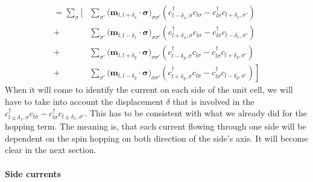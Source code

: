 \documentclass[../main.tex]{subfile}
\begin{document}
\begin{equation}\label{eq:CurrentAltermagCommu}
    \begin{aligned}
        = \sum_{\sigma}\Biggl[&
                \sum_{\sigma'}\bigl(\bm{m}_{l,l+\delta_x}\cdot\bm{\sigma}\bigr)_{\sigma\sigma'}
                \left(c_{l-\delta_x,\sigma}^{\dagger}c_{l\sigma} - c_{l\sigma}^{\dagger}c_{l+\delta_x,\sigma'} \right) \\
                +&\sum_{\sigma'}\bigl(\bm{m}_{l,l-\delta_x}\cdot\bm{\sigma}\bigr)_{\sigma\sigma'}
                \left(c_{l+\delta_x,\sigma}^{\dagger}c_{l\sigma} - c_{l\sigma}^{\dagger}c_{l-\delta_x,\sigma'} \right) \\
                +&\sum_{\sigma'}\bigl(\bm{m}_{l,l+\delta_y}\cdot\bm{\sigma}\bigr)_{\sigma\sigma'}
                \left(c_{l-\delta_y,\sigma}^{\dagger}c_{l\sigma} - c_{l\sigma}^{\dagger}c_{l+\delta_y,\sigma'} \right) \\
                +& \sum_{\sigma'}\bigl(\bm{m}_{l,l-\delta_y}\cdot\bm{\sigma}\bigr)_{\sigma\sigma'}
                \left.\left(c_{l+\delta_y,\sigma}^{\dagger}c_{l\sigma} - c_{l\sigma}^{\dagger}c_{l-\delta_y,\sigma'} \right) \right]
    \end{aligned}
\end{equation} 
When it will come to identify the current on each side of the unit cell, we will have to take into account the displacement $\delta$ that is involved in the 
$c_{l\pm\delta_x,\sigma}^{\dagger}c_{l\sigma} -c_{l\sigma}^{\dagger}c_{l\pm\delta_x,\sigma'}$.
This has to be consistent with what we already did for the hopping term. The meaning is, that each current flowing through one side will be dependent on the spin hopping on both direction 
of the side's axis. It will become clear in the next section.\\

\paragraph{Side currents} $~$\\
\end{document}
